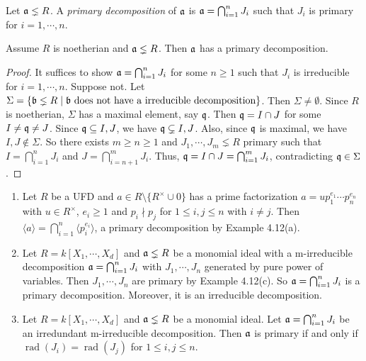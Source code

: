 \begin{definition}
    Let $\mathfrak{a} \lneq R$. A \emph{primary decomposition} of $\mathfrak{a}$ is $\mathfrak{a} = \bigcap_{i=1}^{n} J_i$ such that $J_i$ is primary for $i = 1,\cdots,n$.
\end{definition}

\begin{theorem}[Noether] 
    Assume $R$ is noetherian and $\mathfrak{a} \lneq R$. Then $\mathfrak{a}$ has a primary decomposition.
\end{theorem}

\begin{proof}
    It suffices to show $\mathfrak{a} = \bigcap_{i=1}^{n} J_i$ for some $n \geq 1$ such that $J_i$ is irreducible for $i = 1,\cdots,n$. Suppose not. Let $\Sigma = \{\mathfrak{b} \lneq R \mid \mathfrak{b} \text{ does not have a irreducible decomposition}\}$. Then $\Sigma \neq \emptyset$. Since $R$ is noetherian, $\Sigma$ has a maximal element, say $\mathfrak{q}$. Then $\mathfrak{q} = I \cap J$ for some $I \neq \mathfrak{q} \neq J$. Since $\mathfrak{q} \subseteq I,J$, we have $\mathfrak{q} \subsetneq I,J$. Also, since $\mathfrak{q}$ is maximal, we have $I,J \not \in \Sigma$. So there exists $m \geq n \geq 1$ and $J_1,\cdots,J_m \lneq R$ primary such that $I = \bigcap_{i=1}^{n}J_i$ and $J = \bigcap_{i=n+1}^{m} J_i$. Thus, $\mathfrak{q} = I \cap J = \bigcap_{i=1}^{m} J_i$, contradicting $\mathfrak{q} \in \Sigma$.
\end{proof}

\begin{example}
    \begin{enumerate}
        \item Let $R$ be a UFD and $a \in R \setminus \{R^{\times} \cup 0\}$ has a prime factorization $a = up_1^{e_1} \cdots p_n^{e_n}$ with $u \in R^{\times}$, $e_i \geq 1$ and $p_i \nmid p_j$ for $1 \leq i,j \leq n$ with $i \neq j$. Then $\langle a \rangle = \bigcap_{i=1}^{n} \langle p_i^{e_i} \rangle$, a primary decomposition by Example 4.12(a). 
        \item Let $R = k[X_1,\cdots,X_d]$ and $\mathfrak{a} \lneq R$ be a monomial ideal with a m-irreducible decomposition $\mathfrak{a} = \bigcap_{i=1}^{n}J_i$ with $J_1,\cdots,J_n$ generated by pure power of variables. Then $J_1,\cdots,J_n$ are primary by Example 4.12(c). So $\mathfrak{a} = \bigcap_{i=1}^{n} J_i$ is a primary decomposition. Moreover, it is an irreducible decomposition.
        \item Let $R = k[X_1,\cdots,X_d]$ and $\mathfrak{a} \lneq R$ be a monomial ideal. Let $\mathfrak{a} = \bigcap_{i=1}^{n} J_i$ be an irredundant m-irreducible decomposition. Then $\mathfrak{a}$ is primary if and only if $\operatorname{rad}(J_i) = \operatorname{rad}(J_j)$ for $1 \leq i,j \leq n$.
    \end{enumerate}
\end{example}

